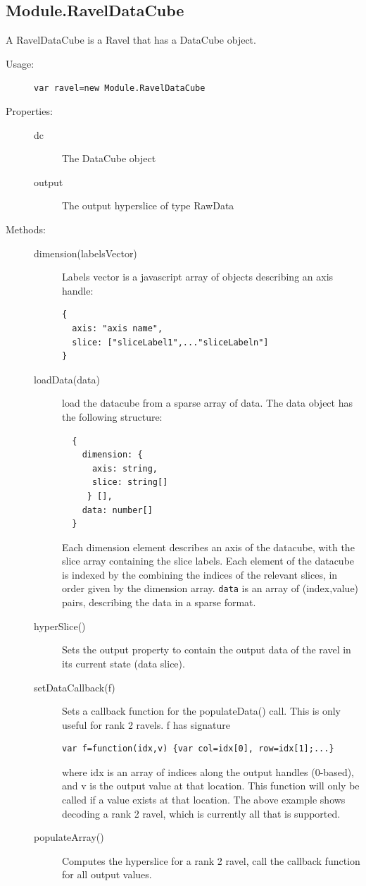 \documentclass{article}
\begin{document}
\subsection{Module.RavelDataCube}

A RavelDataCube is a Ravel that has a DataCube object.

\begin{description}
\item[Usage:] \verb+var ravel=new Module.RavelDataCube+
  
\item[Properties:]\mbox{}
  \begin{description}
  \item[dc] The DataCube object
  \item[output] The output hyperslice of type RawData
  \end{description}
  
\item[Methods:]\mbox{}
  \begin{description}
  \item[dimension(labelsVector)]  Labels vector is a javascript array of
  objects describing an axis handle:
\begin{verbatim}
{
  axis: "axis name",
  slice: ["sliceLabel1",..."sliceLabeln"]
} 
\end{verbatim}
  \item[loadData(data)] load the datacube from a sparse array of
    data. The data object has the following structure:
\begin{verbatim}
  {
    dimension: {
      axis: string,
      slice: string[]
     } [],
    data: number[]
  }
\end{verbatim}
   Each dimension element describes an axis of the datacube, with the
   slice array containing the slice labels. Each element of the
   datacube is indexed by the combining the indices of the relevant
   slices, in order given by the dimension array. \verb+data+ is an
   array of  (index,value) pairs, describing the data in a sparse format.
  \item[hyperSlice()] Sets the output property to contain the output
    data of the ravel in its current state (data slice). 
  \item[setDataCallback(f)] Sets a callback function for the
    populateData() call. This is only useful for rank 2 ravels. f has
    signature
\begin{verbatim}
var f=function(idx,v) {var col=idx[0], row=idx[1];...}
\end{verbatim}
where idx is an array of indices along the output handles (0-based),
and v is the output value at that location. This function will only be
called if a value exists at that location. The above example shows
decoding a rank 2 ravel, which is currently all that is supported.
\item[populateArray()] Computes the hyperslice for a rank 2 ravel,
call the callback function for all output values.

  \end{description}
\end{description}
\end{document}
